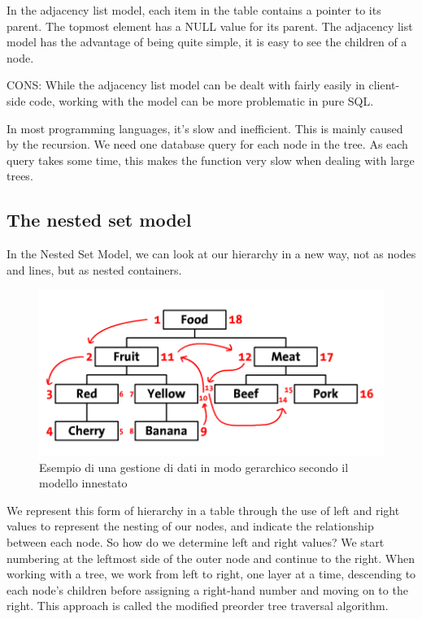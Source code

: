 In the adjacency list model, each item in the table contains a pointer to its parent. The topmost element has a NULL value for its parent.
The adjacency list model has the advantage of being quite simple, it is easy to see the children of a node. 

CONS:
While the adjacency list model can be dealt with fairly easily in client-side code, working with the model can be more problematic in 
pure SQL.

In most programming languages, it’s slow and inefficient. This is mainly caused by the recursion. We need one database query for each 
node in the tree.
As each query takes some time, this makes the function very slow when dealing with large trees.

\subsection{The nested set model}
In the Nested Set Model, we can look at our hierarchy in a new way, not as nodes and lines, but as nested containers. 

\begin{figure}[!htbp]
    \centering
	\includegraphics[scale=1]{images/Nested_Tree_Model_ex.PNG}
	\caption{Esempio di una gestione di dati in modo gerarchico secondo il modello innestato}
\end{figure}

\newpage

We represent this form of hierarchy in a table through the use of left and right values to represent the nesting of our nodes, 
and indicate the relationship between each node.
So how do we determine left and right values? 
We start numbering at the leftmost side of the outer node and continue to the right. When working with a tree, we work from left to 
right, one layer at a time, descending to each node’s children before assigning a right-hand number and moving on to the right. 
This approach is called the modified preorder tree traversal algorithm.

